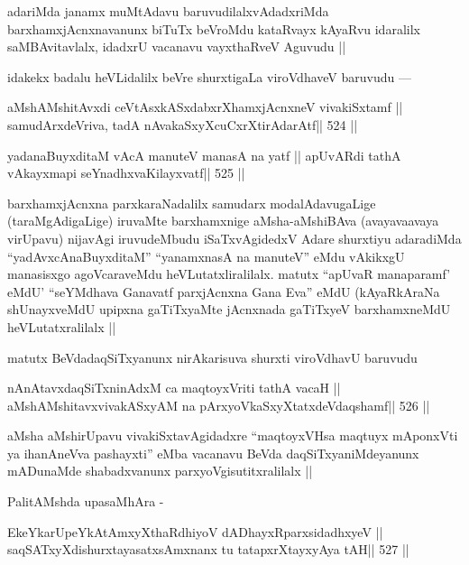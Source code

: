 \begin{artha}
adariMda janamx muMtAdavu baruvudilalxvAdadxriMda
barxhamxjAcnxnavanunx biTuTx beVroMdu kataRvayx kAyaRvu idaralilx
saMBAvitavlalx, idadxrU vacanavu vayxthaRveV Aguvudu ||

idakekx badalu heVLidalilx beVre shurxtigaLa viroVdhaveV baruvudu ---
\end{artha}

\begin{shl}
aMshAMshitAvxdi ceVtAsxkASxdabxrXhamxjAcnxneV vivakiSxtamf ||
samudArxdeVriva, tadA nAvakaSxyXcuCxrXtirAdarAtf\hfill || 524 ||
\end{shl}

\begin{shl}
yadanaBuyxditaM vAcA manuteV manasA na yatf ||
apUvARdi tathA vAkayxmapi seYnadhxvaKilayxvatf\hfill || 525 ||
\end{shl}

\begin{artha}
barxhamxjAcnxna parxkaraNadalilx samudarx modalAdavugaLige
(taraMgAdigaLige) iruvaMte barxhamxnige aMsha-aMshiBAva (avayavaavaya
virUpavu) nijavAgi iruvudeMbudu iSaTxvAgidedxV Adare shurxtiyu
adaradiMda ``yadAvxcAnaBuyxditaM'' ``yanamxnasA na manuteV'' eMdu
vAkikxgU manasisxgo agoVcaraveMdu heVLutatxliralilalx. matutx ``apUvaR
manaparamf' eMdU' ``seYMdhava Ganavatf parxjAcnxna Gana Eva'' eMdU
(kAyaRkAraNa shUnayxveMdU upipxna gaTiTxyaMte jAcnxnada gaTiTxyeV
barxhamxneMdU heVLutatxralilalx || 

matutx BeVdadaqSiTxyanunx nirAkarisuva shurxti viroVdhavU baruvudu
\end{artha}

\begin{shl}
nAnAtavxdaqSiTxninAdxM ca maqtoyxVriti tathA vacaH ||
aMshAMshitavxvivakASxyAM na pArxyoVkaSxyXtatxdeVdaqshamf\hfill || 526 ||
\end{shl}

\begin{artha}
aMsha aMshirUpavu vivakiSxtavAgidadxre ``maqtoyxVHsa maqtuyx mAponxVti
ya ihanAneVva pashayxti'' eMba vacanavu BeVda daqSiTxyaniMdeyanunx
mADunaMde shabadxvanunx parxyoVgisutitxralilalx ||

PalitAMshda upasaMhAra -
\end{artha}

\begin{shl}
EkeYkarUpeYkAtAmxyXthaRdhiyoV dADhayxRparxsidadhxyeV ||
saqSATxyXdishurxtayasatxsAmxnanx tu tatapxrXtayxyAya tAH\hfill || 527 ||
\end{shl}


